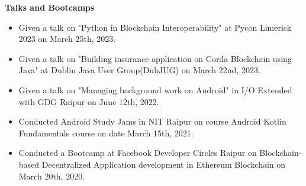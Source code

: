 \documentclass{article}
\begin{document}
\noindent \large \textbf{\textcolor{NavyBlue}{Talks and Bootcamps}}
\begin{itemize}[noitemsep,nolistsep,leftmargin=*]
    \item { \normalsize Given a talk on "Python in Blockchain Interoperability" at Pycon Limerick 2023 on March 25th, 2023.}
    \item { \normalsize Given a talk on "Building insurance application on Corda Blockchain using Java" at Dublin Java User Group(DubJUG) on March 22nd, 2023.}
    \item { \normalsize Given a talk on "Managing background work on Android" in I/O Extended with GDG Raipur on June 12th, 2022.  }
    \item { \normalsize Conducted Android Study Jams in NIT Raipur on course Android Kotlin Fundamentals course on date March 15th, 2021. }
    \item { \normalsize Conducted a Bootcamp at Facebook Developer Circles Raipur on Blockchain-based Decentralized Application development in Ethereum Blockchain on March 20th, 2020. }
\end{itemize}
\vspace{3pt}
\end{document}
